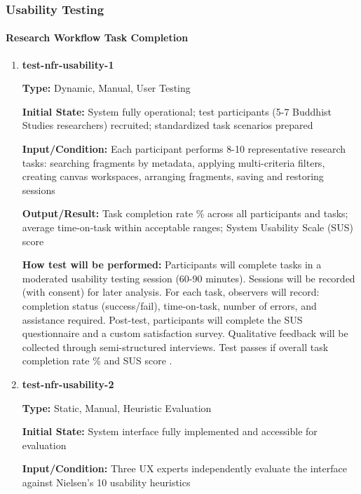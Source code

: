 \documentclass[12pt, titlepage]{article}
\begin{document}
\subsubsection{Usability Testing}

\paragraph{Research Workflow Task Completion}

\begin{enumerate}

\item \textbf{test-nfr-usability-1}

\textbf{Type:} Dynamic, Manual, User Testing
					
\textbf{Initial State:} System fully operational; test participants (5-7 Buddhist Studies researchers) recruited; standardized task scenarios prepared
					
\textbf{Input/Condition:} Each participant performs 8-10 representative research tasks: searching fragments by metadata, applying multi-criteria filters, creating canvas workspaces, arranging fragments, saving and restoring sessions
					
\textbf{Output/Result:} Task completion rate \% across all participants and tasks; average time-on-task within acceptable ranges; System Usability Scale (SUS) score 
					
\textbf{How test will be performed:} Participants will complete tasks in a moderated usability testing session (60-90 minutes). Sessions will be recorded (with consent) for later analysis. For each task, observers will record: completion status (success/fail), time-on-task, number of errors, and assistance required. Post-test, participants will complete the SUS questionnaire and a custom satisfaction survey. Qualitative feedback will be collected through semi-structured interviews. Test passes if overall task completion rate \% and SUS score .

\item \textbf{test-nfr-usability-2}

\textbf{Type:} Static, Manual, Heuristic Evaluation
					
\textbf{Initial State:} System interface fully implemented and accessible for evaluation
					
\textbf{Input/Condition:} Three UX experts independently evaluate the interface against Nielsen's 10 usability heuristics
					

\end{enumerate}
\end{document}
